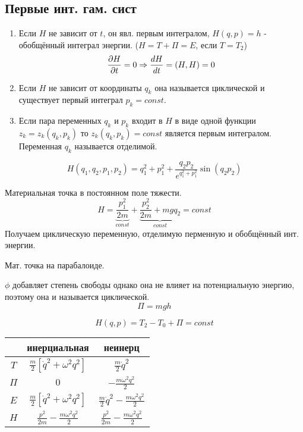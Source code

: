 \documentclass{article}
\begin{document}
\subsection{Первые инт. гам. сист}
\begin{enumerate}
  \item Если $H$ не зависит от $t$, он явл. первым интегралом,
    $H(q,p)=h$ - обобщённый интеграл энергии. ($H=T+\Pi=E$, если $T=T_2$)
    \[
      \frac{\partial{H}}{\partial{t}}=0 \Rightarrow \frac{dH}{dt}=(H,H)=0
    \]
  \item Если $H$ не зависит от координаты $q_k$ она называется циклической
    и существует первый интеграл $p_k=const$.
  \item Если пара переменных $q_k$ и $p_k$ входит в $H$ в виде одной функции
    $z_k=z_k(q_k,p_k)$ то $z_k(q_k,p_k)=const$ является первым интегралом.
    Переменная $q_k$ называется отделимой.
\end{enumerate}
\begin{eg}
  \[
    H(q_1,q_2,p_1,p_2)=q_1^{2}+p_1^{2}+\frac{q_2p_2}{e^{q_1^{2}+p_1^{2}}}\sin(q_2p_2)
  \]
\end{eg}
\begin{eg}
  \phantom{.}

  Материальная точка в постоянном поле тяжести.
  \[
    H=\underbrace{\frac{p_1^{2}}{2m}}_{const}+\underbrace{\frac{p_2^{2}}{2m}+mgq_2}_{const}=const
  \]
  Получаем циклическую переменную, отделимую перменную и обобщённый инт. энергии.
\end{eg}
\begin{eg}
  Мат. точка на парабалоиде.

  $\phi$ добавляет степень свободы однако она не влияет на потенциальную энергию,
  поэтому она и называется циклической.
  \[
    \Pi=mgh
  \]
\end{eg}
\begin{eg}
  \[
    H(q,p)=T_2-T_0+\Pi=const
  \]
  \phantom{.}

  \begin{center}
  \begin{tabular}{| c | c | c |}
    \hline
     & инерциальная & неинерц \\
    \hline
    $T$ & $\frac{m}{2}[\dot{q}^{2}+\omega^{2}q^{2}]$ & $\frac{m}{2}\dot{q}^{2}$  \\
    \hline
    $\Pi$ & $0$ & $-\frac{m\omega^{2}q^{2}}{2}$ \\ 
    \hline
    $E$ & $\frac{m}{2}[\dot{q}^{2}+\omega^{2}q^{2}]$ & $\frac{m}{2}\dot{q}^{2}-\frac{m\omega^{2}q^{2}}{2}$ \\
    \hline
    $H$ & $\frac{p^{2}}{2m}-\frac{m\omega^{2}q^{2}}{2}$ & $\frac{p^{2}}{2m}-\frac{m\omega^{2}q^{2}}{2}$\\
    \hline
  \end{tabular}
  \end{center}
\end{eg}
\end{document}
